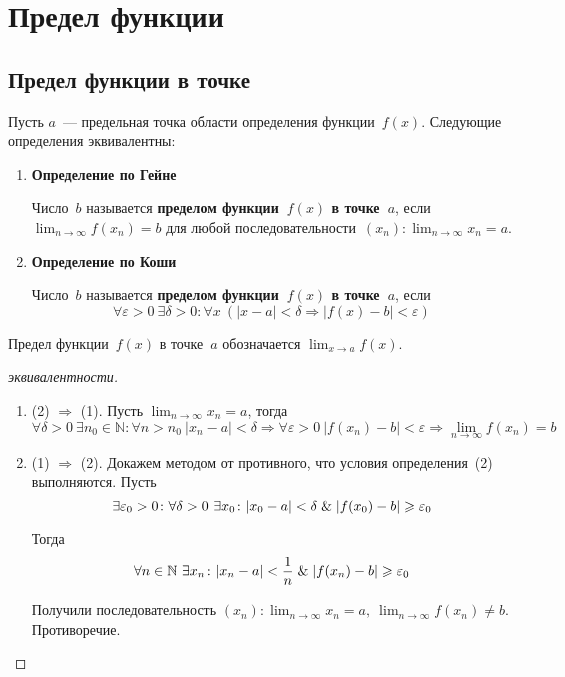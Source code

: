 \section{Предел функции}
\subsection{Предел функции в точке}
 

Пусть $a$~--- предельная точка области определения функции~$f(x)$.
Следующие определения эквивалентны:
\begin{enumerate}
	\item \textbf{Определение по Гейне}
	
	Число~$b$ называется \textbf{пределом функции~$f(x)$ в точке~$a$}, если $\displaystyle \lim_{n \to \infty} f(x_n) = b$ для любой последовательности~$\displaystyle (x_n) \colon \lim_{n \to \infty} x_n = a$.
	
	\item \textbf{Определение по Коши}
	
	Число~$b$ называется \textbf{пределом функции~$f(x)$ в точке~$a$}, если
	\begin{equation*}
	\forall \varepsilon > 0 \ \exists \delta > 0 \colon \forall x \ (|x - a| < \delta \Rightarrow |f(x) - b| < \varepsilon)
	\end{equation*}
\end{enumerate}

Предел функции~$f(x)$ в точке~$a$ обозначается $\displaystyle \lim_{x \to a} f(x)$.
\begin{proof}[эквивалентности]
\begin{enumerate}
	\item (2) $\Rightarrow$ (1).
	Пусть $\displaystyle \lim_{n \to \infty} x_n = a$, тогда
	\begin{equation*}
	\forall \delta > 0 \ \exists n_0 \in \mathbb N \colon \forall n > n_0 \ |x_n - a| < \delta \Rightarrow
	\forall \varepsilon > 0 \ |f(x_n) - b| < \varepsilon \Rightarrow
	\lim_{n \to \infty} f(x_n) = b
	\end{equation*}
	
	\item (1) $\Rightarrow$ (2).
	Докажем методом от противного, что условия определения~(2) выполняются.
	Пусть
	\begin{equation*}
	\exists \varepsilon_0 > 0 \colon \forall \delta > 0 \ \exists x_0 \colon |x_0 - a| < \delta \mathrel{\&} |f(x_0) - b| \geqslant \varepsilon_0
	\end{equation*}
	
	Тогда
	\begin{equation*}
	\forall n \in \mathbb N \ \exists x_n \colon |x_n - a| < \frac1n \mathrel{\&} |f(x_n) - b| \geqslant \varepsilon_0
	\end{equation*}
	
	Получили последовательность $\displaystyle (x_n) \colon \lim_{n \to \infty} x_n = a, \ \lim_{n \to \infty} f(x_n) \neq b$.
	Противоречие.
\end{enumerate}
\end{proof}

